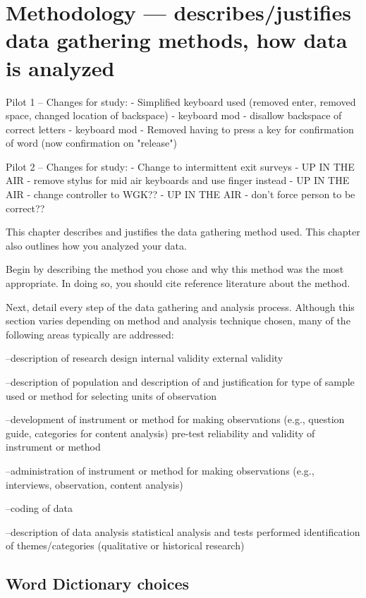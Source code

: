 \chapter{Methodology --- describes/justifies data gathering methods, how data is analyzed}

Pilot 1 -- Changes for study:
- Simplified keyboard used (removed enter, removed space, changed location of backspace)
- keyboard mod - disallow backspace of correct letters
- keyboard mod - Removed having to press a key for confirmation of word (now confirmation on "release")

Pilot 2 -- Changes for study:
- Change to intermittent exit surveys
- UP IN THE AIR - remove stylus for mid air keyboards and use finger instead
- UP IN THE AIR - change controller to WGK??
- UP IN THE AIR - don't force person to be correct??

 This chapter describes and justifies the data gathering method used. This chapter also outlines how you
analyzed your data.

 Begin by describing the method you chose and why this method was the most appropriate. In doing so, you
should cite reference literature about the method.

 Next, detail every step of the data gathering and analysis process. Although this section varies depending
on method and analysis technique chosen, many of the following areas typically are addressed:

--description of research design
 internal validity
 external validity

--description of population and description of and justification for type of sample used or method for
selecting units of observation

--development of instrument or method for making observations (e.g., question guide, categories for content
analysis)
 pre-test
 reliability and validity of instrument or method

--administration of instrument or method for making observations (e.g., interviews, observation, content
analysis)

--coding of data

--description of data analysis
 statistical analysis and tests performed
 identification of themes/categories (qualitative or historical research) 

\section{Word Dictionary choices}

